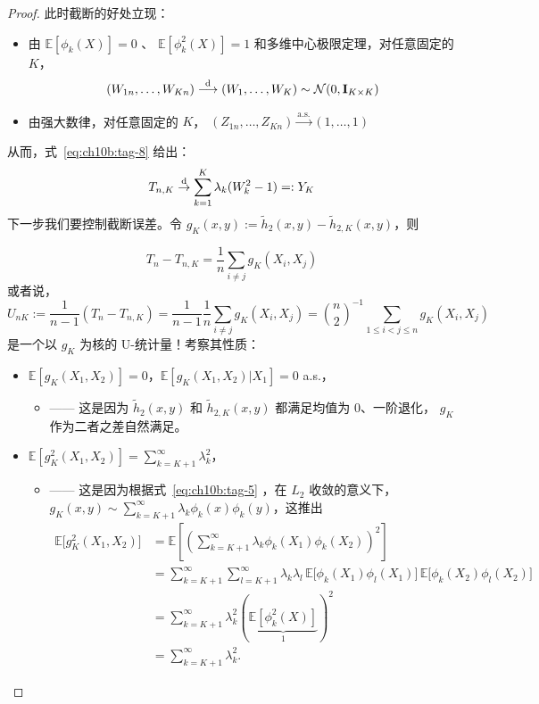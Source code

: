 \begin{proof}
此时截断的好处立现：
\begin{itemize}
\tightlist
\item
  由 $\mathbb E[\phi_k(X)]=0$ 、 $\mathbb E[\phi_k^2(X)]=1$ 和多维中心极限定理，对任意固定的 $K$， 
  $$(W_{1n}, \dots, W_{Kn}) \overset{\rm d}\longrightarrow (W_1, \dots, W_K)\sim \mathcal N(0,\mathbf I_{K\times K})$$
\item
  由强大数律，对任意固定的 $K$， $(Z_{1n},\dots,Z_{Kn})\overset{\text{a.s.}}\longrightarrow (1,\dots,1)$
\end{itemize}

从而，式~\eqref{eq:ch10b:tag-8} 给出：
\begin{equation}
\label{eq:ch10b:tag-9}
T_{n,K} \overset{\rm d}\to \sum_{k=1}^{K} \lambda_k (W_k^2 - 1) =:Y_K
\end{equation}
下一步我们要控制截断误差。令 $g_K(x,y) := \widetilde{h}_2(x,y) - \widetilde{h}_{2,K}(x,y)$，则

$$T_n - T_{n,K} = \frac{1}{n} \sum_{i\neq j} g_K(X_i,X_j)$$
或者说，
\[U_{nK}:=\frac1{n-1}(T_n - T_{n,K}) = \frac1{n-1}\frac{1}{n} \sum_{i\neq j} g_K(X_i,X_j)=\binom n2^{-1}\sum_{1\le i<j\le n}g_K(X_i,X_j)\]
是一个以 $g_K$ 为核的 U-统计量！考察其性质：

\begin{itemize}
\tightlist
\item
  $\mathbb{E}[g_K(X_1,X_2)] = 0$，$\mathbb{E}[g_K(X_1,X_2)|X_1] = 0$ a.s.，

\begin{itemize}
  \tightlist
  \item
    ------ 这是因为 $\widetilde h_2(x,y)$ 和 $\widetilde h_{2,K}(x,y)$ 都满足均值为 0、一阶退化， $g_K$ 作为二者之差自然满足。
  \end{itemize}
\item
  $\mathbb{E}[g_K^2(X_1,X_2)] = \sum_{k=K+1}^{\infty} \lambda_k^2$，

\begin{itemize}
  \tightlist
  \item
    ------ 这是因为根据式~\eqref{eq:ch10b:tag-5} ，在 $L_2$ 收敛的意义下， $g_K(x,y)\sim\sum_{k=K+1}^{\infty} \lambda_k \phi_k(x) \phi_k(y)$，这推出
    \[    \begin{aligned} \mathbb{E}\bigl[ g_K^2(X_1,X_2) \bigr] &= \mathbb{E}\left[ \left( \sum_{k=K+1}^{\infty} \lambda_k \phi_k(X_1)\phi_k(X_2) \right)^2 \right] \\ &= \sum_{k=K+1}^{\infty} \sum_{l=K+1}^{\infty} \lambda_k \lambda_l \, \mathbb{E}\bigl[ \phi_k(X_1)\phi_l(X_1) \bigr] \, \mathbb{E}\bigl[ \phi_k(X_2)\phi_l(X_2) \bigr] \\ &=\sum_{k=K+1}^{\infty} \lambda_k^2(\underbrace{\mathbb E[\phi_k^2(X)]}_{1})^2\\ &= \sum_{k=K+1}^{\infty} \lambda_k^2. \end{aligned}
    \]  \end{itemize}
\end{itemize}


\end{proof}
